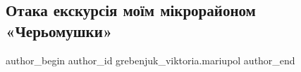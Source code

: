  
 
 
 
 

\subsection{Отака екскурсія моїм мікрорайоном «Черьомушки»}
\label{sec:17_04_2022.fb.grebenjuk_viktoria.mariupol.1.otaka_yekskurs_ya_mo}

\ifcmt
 author_begin
   author_id grebenjuk_viktoria.mariupol
 author_end
\fi
